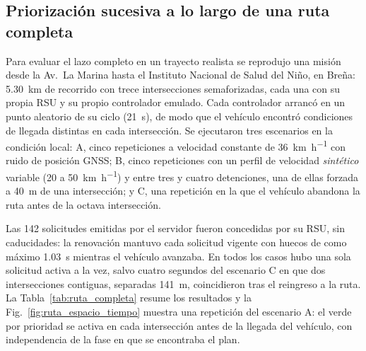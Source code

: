 \subsection{Priorización sucesiva a lo largo de una ruta completa}
\label{ssec:priorizacion_sucesiva}

Para evaluar el lazo completo en un trayecto realista se reprodujo una
misión desde la Av.~La Marina hasta el Instituto Nacional de Salud del Niño,
en Breña: \SI{5.30}{\kilo\meter} de recorrido con trece intersecciones
semaforizadas, cada una con su propia RSU y su propio controlador emulado.
Cada controlador arrancó en un punto aleatorio de su ciclo (\SI{21}{\second}),
de modo que el vehículo encontró condiciones de llegada distintas en cada
intersección. Se ejecutaron tres escenarios en la condición local: A, cinco
repeticiones a velocidad constante de \SI{36}{\kilo\meter\per\hour} con ruido
de posición GNSS; B, cinco repeticiones con un perfil de velocidad
\emph{sintético} variable (20 a \SI{50}{\kilo\meter\per\hour}) y entre tres y
cuatro detenciones, una de ellas forzada a \SI{40}{\meter} de una intersección;
y C, una repetición en la que el vehículo abandona la ruta antes de la octava
intersección.

Las 142 solicitudes emitidas por el servidor fueron concedidas por su RSU,
sin caducidades: la renovación mantuvo cada solicitud vigente con huecos de
como máximo \SI{1.03}{\second} mientras el vehículo avanzaba. En todos los
casos hubo una sola solicitud activa a la vez, salvo cuatro segundos del
escenario C en que dos intersecciones contiguas, separadas
\SI{141}{\meter}, coincidieron tras el reingreso a la ruta. La
Tabla~\ref{tab:ruta_completa} resume los resultados y la
Fig.~\ref{fig:ruta_espacio_tiempo} muestra una repetición del escenario A: el
verde por prioridad se activa en cada intersección antes de la llegada del
vehículo, con independencia de la fase en que se encontraba el plan.

